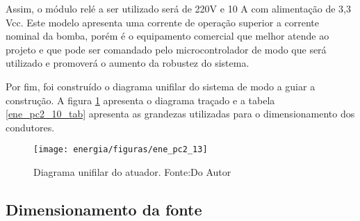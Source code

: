 Assim, o módulo relé a ser utilizado será de 220V e 10 A com alimentação de 3,3 Vcc. Este modelo apresenta uma corrente de operação superior a corrente nominal da bomba, porém é o equipamento comercial que melhor atende ao projeto e que pode ser comandado pelo microcontrolador de modo que será utilizado e promoverá o aumento da robustez do sistema.

Por fim, foi construído o diagrama unifilar do sistema de modo a guiar a construção. A figura \ref{ene_pc2_13} apresenta o diagrama traçado e a tabela \ref{ene_pc2_10_tab} apresenta as grandezas utilizadas para o dimensionamento dos condutores.

\begin{figure}[H]
		\centering
		\texttt{[image: energia/figuras/ene\_pc2\_13]}
		\caption{Diagrama unifilar do atuador. Fonte:Do Autor}
		\label{ene_pc2_13}
\end{figure}

\begin{table}[H]
\caption{Dimensionamento dos condutores de força do atuador}
\label{ene_pc2_10_tab}
\end{table}

\subsection{Dimensionamento da fonte}



